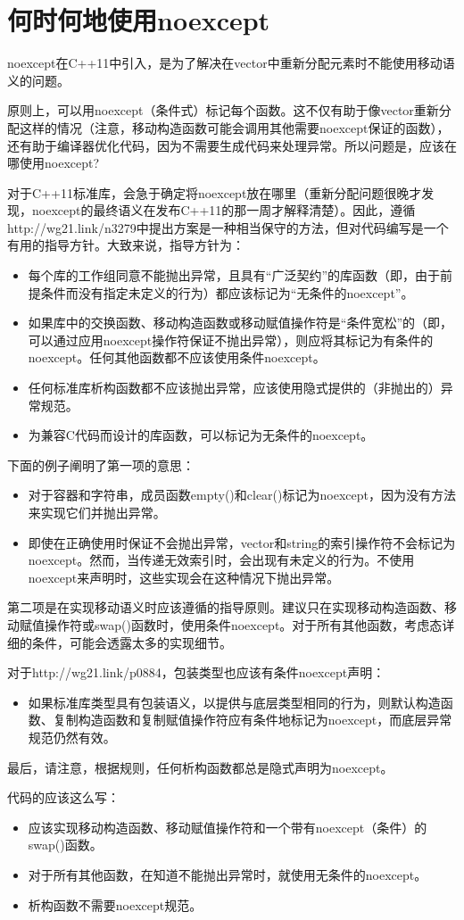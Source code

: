 \section{何时何地使用noexcept}
noexcept在C++11中引入，是为了解决在vector中重新分配元素时不能使用移动语义的问题。

原则上，可以用noexcept（条件式）标记每个函数。这不仅有助于像vector重新分配这样的情况（注意，移动构造函数可能会调用其他需要noexcept保证的函数），还有助于编译器优化代码，因为不需要生成代码来处理异常。所以问题是，应该在哪使用noexcept?

对于C++11标准库，会急于确定将noexcept放在哪里（重新分配问题很晚才发现，noexcept的最终语义在发布C++11的那一周才解释清楚）。因此，遵循http://wg21.link/n3279中提出方案是一种相当保守的方法，但对代码编写是一个有用的指导方针。大致来说，指导方针为：

\begin{itemize}
	\item 每个库的工作组同意不能抛出异常，且具有“广泛契约”的库函数（即，由于前提条件而没有指定未定义的行为）都应该标记为“无条件的noexcept”。
	\item 如果库中的交换函数、移动构造函数或移动赋值操作符是“条件宽松”的（即，可以通过应用noexcept操作符保证不抛出异常），则应将其标记为有条件的noexcept。任何其他函数都不应该使用条件noexcept。
	\item 任何标准库析构函数都不应该抛出异常，应该使用隐式提供的（非抛出的）异常规范。
	\item 为兼容C代码而设计的库函数，可以标记为无条件的noexcept。
\end{itemize}

下面的例子阐明了第一项的意思：

\begin{itemize}
	\item 对于容器和字符串，成员函数empty()和clear()标记为noexcept，因为没有方法来实现它们并抛出异常。
	\item 即使在正确使用时保证不会抛出异常，vector和string的索引操作符不会标记为noexcept。然而，当传递无效索引时，会出现有未定义的行为。不使用noexcept来声明时，这些实现会在这种情况下抛出异常。
\end{itemize}

第二项是在实现移动语义时应该遵循的指导原则。建议只在实现移动构造函数、移动赋值操作符或swap()函数时，使用条件noexcept。对于所有其他函数，考虑态详细的条件，可能会透露太多的实现细节。

对于http://wg21.link/p0884，包装类型也应该有条件noexcept声明：

\begin{itemize}
	\item 如果标准库类型具有包装语义，以提供与底层类型相同的行为，则默认构造函数、复制构造函数和复制赋值操作符应有条件地标记为noexcept，而底层异常规范仍然有效。
\end{itemize}

最后，请注意，根据规则，任何析构函数都总是隐式声明为noexcept。

代码的应该这么写：

\begin{itemize}
	\item 应该实现移动构造函数、移动赋值操作符和一个带有noexcept（条件）的swap()函数。
	\item 对于所有其他函数，在知道不能抛出异常时，就使用无条件的noexcept。
	\item 析构函数不需要noexcept规范。
\end{itemize}







